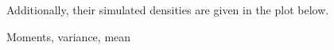 Additionally, their simulated densities are given in the plot below.



Moments, variance, mean

%
%
%
%
%
%
%
